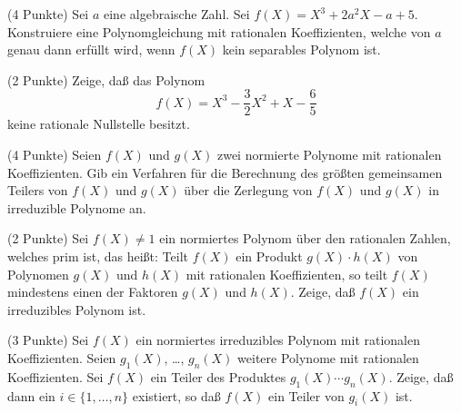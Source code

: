 \documentclass{algsheet}
\begin{document}
\begin{exercise}(4 Punkte)\newline
    Sei \(a\) eine algebraische Zahl. Sei
    \(f(X) = X^3 + 2 a^2 X - a + 5\). Konstruiere eine Polynomgleichung mit
    rationalen Koeffizienten, welche von \(a\) genau dann erfüllt wird, wenn
    \(f(X)\) kein separables Polynom ist.
\end{exercise}



\begin{exercise}(2 Punkte)\newline
    Zeige, daß das Polynom
    \[
        f(X) = X^3 - \frac 3 2 X^2 + X - \frac 6 5
    \]
    keine rationale Nullstelle besitzt.
\end{exercise}

\begin{exercise}(4 Punkte)\newline
    Seien \(f(X)\) und \(g(X)\) zwei normierte Polynome mit rationalen 
    Koeffizienten.
    Gib ein Verfahren für die Berechnung des größten gemeinsamen Teilers von
    \(f(X)\) und \(g(X)\) über die Zerlegung von \(f(X)\) und \(g(X)\) in
    irreduzible Polynome an.
\end{exercise}

\begin{exercise}(2 Punkte)\newline
    Sei \(f(X) \neq 1\) ein normiertes Polynom über den rationalen Zahlen, welches prim ist, das heißt:
    Teilt \(f(X)\) ein Produkt \(g(X) \cdot h(X)\) von Polynomen \(g(X)\) und \(h(X)\) mit rationalen
    Koeffizienten, so teilt \(f(X)\) mindestens einen der Faktoren \(g(X)\) und \(h(X)\). Zeige, daß
    \(f(X)\) ein irreduzibles Polynom ist.
\end{exercise}

\begin{exercise}(3 Punkte)\newline
    Sei \(f(X)\) ein normiertes irreduzibles Polynom mit rationalen
    Koeffizienten. Seien \(g_1(X)\), \dots, \(g_n(X)\) weitere Polynome mit rationalen Koeffizienten.
    Sei \(f(X)\) ein Teiler des Produktes \(g_1(X) \dotsm g_n(X)\). Zeige, daß dann ein
    \(i \in \{1, \dotsc, n\}\) existiert, so daß \(f(X)\) ein Teiler von \(g_i(X)\) ist.
\end{exercise}
\end{document}
